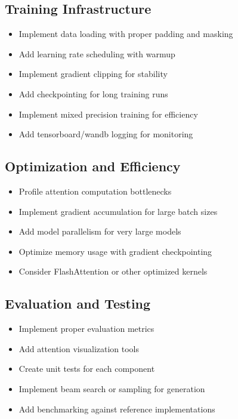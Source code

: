 \subsection{Training Infrastructure}
\begin{itemize}
    \item[$\square$] Implement data loading with proper padding and masking
    \item[$\square$] Add learning rate scheduling with warmup
    \item[$\square$] Implement gradient clipping for stability
    \item[$\square$] Add checkpointing for long training runs
    \item[$\square$] Implement mixed precision training for efficiency
    \item[$\square$] Add tensorboard/wandb logging for monitoring
\end{itemize}

\subsection{Optimization and Efficiency}
\begin{itemize}
    \item[$\square$] Profile attention computation bottlenecks
    \item[$\square$] Implement gradient accumulation for large batch sizes
    \item[$\square$] Add model parallelism for very large models
    \item[$\square$] Optimize memory usage with gradient checkpointing
    \item[$\square$] Consider FlashAttention or other optimized kernels
\end{itemize}

\subsection{Evaluation and Testing}
\begin{itemize}
    \item[$\square$] Implement proper evaluation metrics
    \item[$\square$] Add attention visualization tools
    \item[$\square$] Create unit tests for each component
    \item[$\square$] Implement beam search or sampling for generation
    \item[$\square$] Add benchmarking against reference implementations
\end{itemize}

